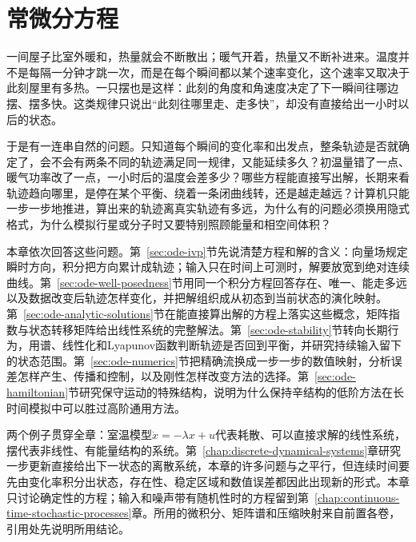 \chapter{常微分方程}
\label{chap:ordinary-differential-equations}

一间屋子比室外暖和，热量就会不断散出；暖气开着，热量又不断补进来。温度并不是每隔一分钟才跳一次，而是在每个瞬间都以某个速率变化，这个速率又取决于此刻屋里有多热。一只摆也是这样：此刻的角度和角速度决定了下一瞬间往哪边摆、摆多快。这类规律只说出“此刻往哪里走、走多快”，却没有直接给出一小时以后的状态。

于是有一连串自然的问题。只知道每个瞬间的变化率和出发点，整条轨迹是否就确定了，会不会有两条不同的轨迹满足同一规律，又能延续多久？初温量错了一点、暖气功率改了一点，一小时后的温度会差多少？哪些方程能直接写出解，长期来看轨迹趋向哪里，是停在某个平衡、绕着一条闭曲线转，还是越走越远？计算机只能一步一步地推进，算出来的轨迹离真实轨迹有多远，为什么有的问题必须换用隐式格式，为什么模拟行星或分子时又要特别照顾能量和相空间体积？

本章依次回答这些问题。第~\ref{sec:ode-ivp}节先说清楚方程和解的含义：向量场规定瞬时方向，积分把方向累计成轨迹；输入只在时间上可测时，解要放宽到绝对连续曲线。第~\ref{sec:ode-well-posedness}节用同一个积分方程回答存在、唯一、能走多远以及数据改变后轨迹怎样变化，并把解组织成从初态到当前状态的演化映射。第~\ref{sec:ode-analytic-solutions}节在能直接算出解的方程上落实这些概念，矩阵指数与状态转移矩阵给出线性系统的完整解法。第~\ref{sec:ode-stability}节转向长期行为，用谱、线性化和Lyapunov函数判断轨迹是否回到平衡，并研究持续输入留下的状态范围。第~\ref{sec:ode-numerics}节把精确流换成一步一步的数值映射，分析误差怎样产生、传播和控制，以及刚性怎样改变方法的选择。第~\ref{sec:ode-hamiltonian}节研究保守运动的特殊结构，说明为什么保持辛结构的低阶方法在长时间模拟中可以胜过高阶通用方法。

两个例子贯穿全章：室温模型$\dot x=-\lambda x+u$代表耗散、可以直接求解的线性系统，摆代表非线性、有能量结构的系统。第~\ref{chap:discrete-dynamical-systems}章研究一步更新直接给出下一状态的离散系统，本章的许多问题与之平行，但连续时间要先由变化率积分出状态，存在性、稳定区域和数值误差都因此出现新的形式。本章只讨论确定性的方程；输入和噪声带有随机性时的方程留到第~\ref{chap:continuous-time-stochastic-processes}章。所用的微积分、矩阵谱和压缩映射来自前置各卷，引用处先说明所用结论。

